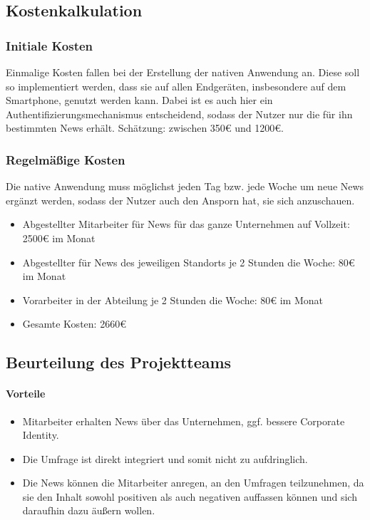 \subsection{Kostenkalkulation}

\subsubsection{Initiale Kosten}

Einmalige Kosten fallen bei der Erstellung der nativen Anwendung an. Diese soll so implementiert werden, dass sie auf allen Endgeräten, insbesondere auf dem Smartphone, genutzt werden kann. Dabei ist es auch hier ein Authentifizierungsmechanismus entscheidend, sodass der Nutzer nur die für ihn bestimmten News erhält.
Schätzung: zwischen 350€ und 1200€.

\subsubsection{Regelmäßige Kosten}

Die native Anwendung muss möglichst jeden Tag bzw. jede Woche um neue News ergänzt werden, sodass der Nutzer auch den Ansporn hat, sie sich anzuschauen. 

\begin{itemize}
\item Abgestellter Mitarbeiter für News für das ganze Unternehmen auf Vollzeit:	2500€ im Monat
\item Abgestellter für News des jeweiligen Standorts je 2 Stunden die Woche:	80€ im Monat
\item Vorarbeiter in der Abteilung je 2 Stunden die Woche:	80€ im Monat
\item Gesamte Kosten:	2660€
\end{itemize}


\subsection{Beurteilung des Projektteams}

\paragraph{Vorteile}

\begin{itemize}
\item	Mitarbeiter erhalten News über das Unternehmen, ggf. bessere Corporate Identity.
\item Die Umfrage ist direkt integriert und somit nicht zu aufdringlich.
\item Die News können die Mitarbeiter anregen, an den Umfragen teilzunehmen, da sie den Inhalt sowohl positiven als auch negativen auffassen können und sich daraufhin dazu äußern wollen.
\end{itemize}

